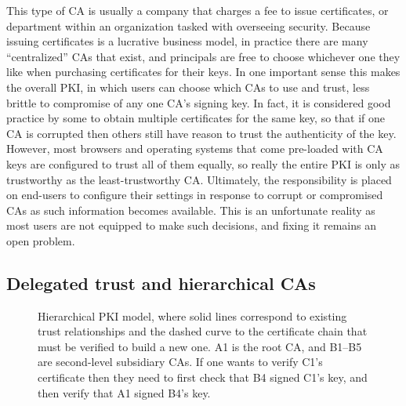 \documentclass[11pt]{article}
\begin{document}
This type of CA is usually a company that charges a fee to issue
certificates, or department within an organization tasked with
overseeing security. Because issuing certificates is a lucrative
business model, in practice there are many ``centralized'' CAs that
exist, and principals are free to choose whichever one they like when
purchasing certificates for their keys. In one important sense this
makes the overall PKI, in which users can choose which CAs to use and
trust, less brittle to compromise of any one CA's signing key. In
fact, it is considered good practice by some to obtain multiple
certificates for the same key, so that if one CA is corrupted then
others still have reason to trust the authenticity of the key.
However, most browsers and operating systems that come pre-loaded with
CA keys are configured to trust all of them equally, so really the
entire PKI is only as trustworthy as the least-trustworthy CA.
Ultimately, the responsibility is placed on end-users to configure
their settings in response to corrupt or compromised CAs as such
information becomes available. This is an unfortunate reality as most
users are not equipped to make such decisions, and fixing it remains
an open problem.

\subsection{Delegated trust and hierarchical CAs}

\begin{figure}
\centering
{}
\caption{\label{fig:ca-hierarchy}Hierarchical PKI model, where solid
lines correspond to existing trust relationships and the dashed curve to
the certificate chain that must be verified to build a new one. A1 is the root CA, and B1--B5 are
second-level subsidiary CAs. If
one wants to verify C1's certificate then they need to first check
that B4 signed C1's key, and then verify that A1 signed B4's key.}
\end{figure}
\end{document}
